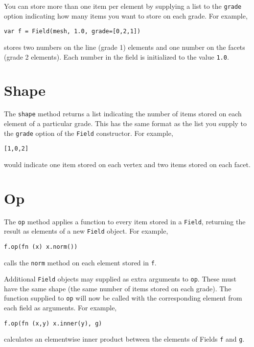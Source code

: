 You can store more than one item per element by supplying a list to the
\texttt{grade} option indicating how many items you want to store on
each grade. For example,

\begin{lstlisting}
var f = Field(mesh, 1.0, grade=[0,2,1])
\end{lstlisting}

stores two numbers on the line (grade 1) elements and one number on the
facets (grade 2 elements). Each number in the field is initialized to
the value \texttt{1.0}.

\hypertarget{shape}{%
\section{Shape}\label{shape}}

The \texttt{shape} method returns a list indicating the number of items
stored on each element of a particular grade. This has the same format
as the list you supply to the \texttt{grade} option of the
\texttt{Field} constructor. For example,

\begin{lstlisting}
[1,0,2]
\end{lstlisting}

would indicate one item stored on each vertex and two items stored on
each facet.

\hypertarget{op}{%
\section{Op}\label{op}}

The \texttt{op} method applies a function to every item stored in a
\texttt{Field}, returning the result as elements of a new \texttt{Field}
object. For example,

\begin{lstlisting}
f.op(fn (x) x.norm())
\end{lstlisting}

calls the \texttt{norm} method on each element stored in \texttt{f}.

Additional \texttt{Field} objects may supplied as extra arguments to
\texttt{op}. These must have the same shape (the same number of items
stored on each grade). The function supplied to \texttt{op} will now be
called with the corresponding element from each field as arguments. For
example,

\begin{lstlisting}
f.op(fn (x,y) x.inner(y), g)
\end{lstlisting}

calculates an elementwise inner product between the elements of Fields
\texttt{f} and \texttt{g}.
